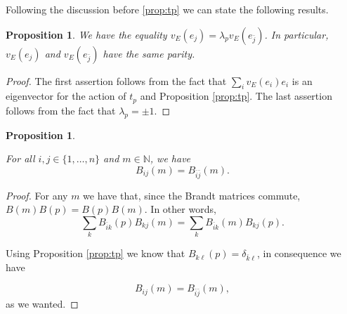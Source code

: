\documentclass[13pt]{amsart}
\newtheorem{proposition}[theorem]{Proposition}
\theoremstyle{remark}
\numberwithin{theorem}{section} \numberwithin{equation}{section}
\begin{document}
Following the discussion before \ref{prop:tp} we can state the following results.

\begin{proposition} \label{prop:sameparity}
We have the equality $v_E(e_j)=\lambda_{p} v_E(e_{\bar{j}})$. In particular, $v_E(e_j)$ and $v_E(e_{\bar{j}})$ have the same parity.
\end{proposition}

\begin{proof}
The first assertion follows from the fact that $\sum_{i} v_E(e_i)e_{i}$ is an eigenvector for the action of $t_p$ and Proposition \ref{prop:tp}. The last assertion follows from the fact that $\lambda_p= \pm 1$.
\end{proof}

\begin{proposition}\label{prop:Bij}

For all $i,j \in \{1, \ldots, n \}$ and $m\in {\mathbb{N}}$, we have
$$B_{ij}(m)=B_{\bar{i}\bar{j}}(m).$$ 

\end{proposition}

\begin{proof} 
For any $m$ we have that, since the Brandt matrices commute, $B(m)B(p)=B(p)B(m)$. In other words, 
\[\sum_k B_{\bar{i}k}(p) B_{kj}(m)= \sum_k B_{\bar{i}k}(m) B_{kj}(p).\]

Using Proposition \ref{prop:tp} we know that $B_{k \ell}(p)=\delta_{ \bar{k} \ell}$, in consequence we have

\[ B_{ij}(m)= B_{\bar{i} \bar{j}}(m)  ,\]
as we wanted. 
\end{proof}
\end{document}
